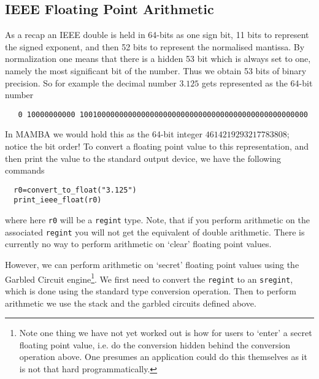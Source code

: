 \subsection{IEEE Floating Point Arithmetic}
\label{sec:ieee}
As a recap an IEEE double is held in 64-bits as one sign bit,
11 bits to represent the signed exponent, and then 52
bits to represent the normalised mantissa. By normalization
one means that there is a hidden 53 bit which is always set
to one, namely the most significant bit of the number.
Thus we obtain 53 bits of binary precision.
So for example the decimal number $3.125$ gets represented as
the 64-bit number
\begin{lstlisting}
   0 10000000000 1001000000000000000000000000000000000000000000000000
\end{lstlisting}
In MAMBA we would hold this as the 64-bit integer $4614219293217783808$; notice
the bit order!
To convert a floating point value to this representation, and then print
the value to the standard output device, we have the following
commands
\begin{lstlisting}
  r0=convert_to_float("3.125")
  print_ieee_float(r0)
\end{lstlisting}
where here \verb|r0| will be a \verb|regint| type.
Note, that if you perform arithmetic on the associated \verb|regint|
you will not get the equivalent of double arithmetic.
There is currently no way to perform arithmetic on `clear'
floating point values.

However, we can perform arithmetic on `secret' floating point values
using the Garbled Circuit engine\footnote{Note one thing we have not
yet worked out is how for users to `enter' a secret floating point
value, i.e. do the conversion hidden behind the conversion
operation above.
One presumes an application could do this themselves as it is not
that hard programmatically.}.
We first need to convert the \verb|regint| to an \verb|sregint|, which
is done using the standard type conversion operation.
Then to perform arithmetic we use the stack and the garbled circuits
defined above.


